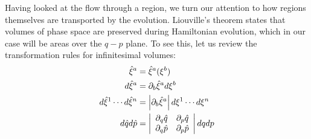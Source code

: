 Having looked at the flow through a region, we turn our attention to how regions themselves are transported by the evolution. Liouville's theorem states that volumes of phase space are preserved during Hamiltonian evolution, which in our case will be areas over the $q-p$ plane. To see this, let us review the transformation rules for infinitesimal volumes:
\begin{equation}\label{rp-cm-volumeTransformation1d}
	\begin{aligned}
		\hat{\xi}^a &= \hat{\xi}^a(\xi^b) \\
		d\hat{\xi}^a &= \partial_b \hat{\xi}^a d\xi^b \\
		d\hat{\xi}^1 \cdots d\hat{\xi}^n &= \left| \partial_b \hat{\xi}^a \right| d\xi^1 \cdots d\xi^n \\
		d\hat{q} d\hat{p} &= \left|\begin{array}{ c c }
			\partial_q \hat{q} & \partial_p \hat{q} \\
			\partial_q \hat{p} & \partial_p \hat{p} \\
		\end{array} \right| dq dp \\
	\end{aligned}	
\end{equation}

